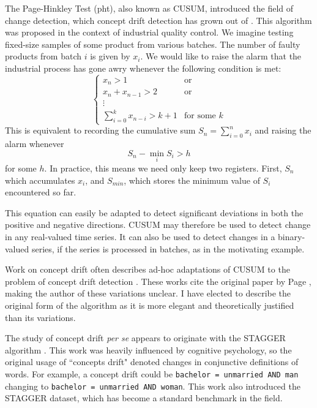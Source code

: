 The Page-Hinkley Test (pht), also known as CUSUM, introduced the field of change detection, which concept drift detection has grown out of \cite{CUSUM}. This algorithm was proposed in the context of industrial quality control. We imagine testing fixed-size samples of some product from various batches. The number of faulty products from batch $i$ is given by $x_i$. We would like to raise the alarm that the industrial process has gone awry whenever the following condition is met:
\begin{equation}
    \begin{cases}
        x_n > 1 & \text{or} \\
        x_n + x_{n-1} > 2 & \text{or} \\
        \vdots \\
        \sum_{i=0}^k x_{n-i} > k + 1 & \text{for some $k$}
    \end{cases}
\end{equation}
This is equivalent to recording the cumulative sum $S_n = \sum_{i=0}^n x_i$ and raising the alarm whenever
\begin{equation}
    S_n - \min_{i} S_i > h
\end{equation}
for some $h$. In practice, this means we need only keep two registers. First, $S_n$ which accumulates $x_i$, and $S_{min}$, which stores the minimum value of $S_i$ encountered so far.

This equation can easily be adapted to detect significant deviations in both the positive and negative directions. CUSUM may therefore be used to detect change in any real-valued time series. It can also be used to detect changes in a binary-valued series, if the series is processed in batches, as in the motivating example. 

Work on concept drift often describes ad-hoc adaptations of CUSUM to the problem of concept drift detection \cite{barros_comparison}\cite{gama_survey}. These works cite the original paper by Page \cite{CUSUM}, making the author of these variations unclear. I have elected to describe the original form of the algorithm as it is more elegant and theoretically justified than its variations.

The study of concept drift {\it per se} appears to originate with the STAGGER algorithm \cite{STAGGER}. This work was heavily influenced by cognitive psychology, so the original usage of ``concepts drift" denoted changes in conjunctive definitions of words. For example, a concept drift could be {\tt bachelor = unmarried AND man} changing to {\tt bachelor = unmarried AND woman}. This work also introduced the STAGGER dataset, which has become a standard benchmark in the field. 


